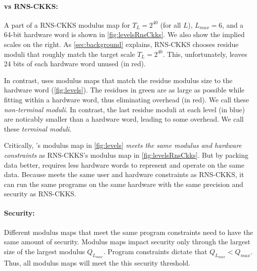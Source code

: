 \paragraph{\name vs RNS-CKKS:}
A part of a RNS-CKKS modulus map for $T_L = 2^{40}$ (for all $L$), $L_{max} = 6$,
and a 64-bit hardware word is shown in \autoref{fig:levelsRnsCkks}. We also
show the implied scales on the right. As \autoref{sec:background} explains,
RNS-CKKS chooses residue moduli that roughly match the target scale $T_L =
2^{40}$.
This, unfortunately, leaves 24 bits of each hardware word unused (in red).

In contrast, \name uses modulus maps that match the residue modulus size to the
hardware word (\autoref{fig:levels}). The residues in green are as large as
possible while fitting within a hardware word, thus eliminating overhead (in red).
We call these \emph{non-terminal moduli}.
In contrast, the last residue moduli at each level (in blue) are noticably
smaller than a hardware word, leading to some overhead. We call these
\emph{terminal moduli}.

Critically, \name's modulus map in \autoref{fig:levels} \emph{meets the same
modulus and hardware constraints} as RNS-CKKS's modulus map in
\autoref{fig:levelsRnsCkks}.
But by packing data better, \name requires less hardware words to represent
and operate on the same data.
Because \name meets the same user and hardware constraints as RNS-CKKS, it can
run the same programs on the same hardware with the same precision and security
as RNS-CKKS.


\paragraph{Security:}
Different modulus maps that meet the same program constraints need to have the
same amount of security. Modulus maps impact security only through the
largest size of the largest modulus $Q_{L_{max}}$. Program constraints
dictate that $Q_{L_{max}} < Q_{max}$. Thus, all modulus maps will meet the
this security threshold.
